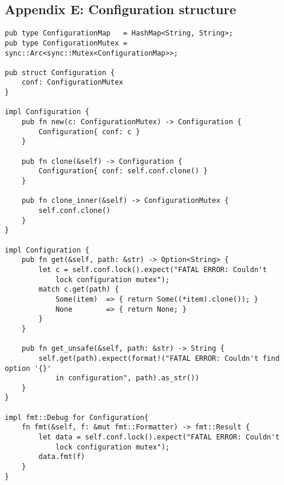     \subsection{Appendix E: Configuration structure}\label{apd:config}
        \begin{verbatim}
pub type ConfigurationMap   = HashMap<String, String>;
pub type ConfigurationMutex = sync::Arc<sync::Mutex<ConfigurationMap>>;

pub struct Configuration {
    conf: ConfigurationMutex
}

impl Configuration {
    pub fn new(c: ConfigurationMutex) -> Configuration {
        Configuration{ conf: c }
    }

    pub fn clone(&self) -> Configuration {
        Configuration{ conf: self.conf.clone() }
    }

    pub fn clone_inner(&self) -> ConfigurationMutex {
        self.conf.clone()
    }
}

impl Configuration {
    pub fn get(&self, path: &str) -> Option<String> {
        let c = self.conf.lock().expect("FATAL ERROR: Couldn't 
            lock configuration mutex");
        match c.get(path) {
            Some(item)  => { return Some((*item).clone()); }
            None        => { return None; }
        }
    }

    pub fn get_unsafe(&self, path: &str) -> String {
        self.get(path).expect(format!("FATAL ERROR: Couldn't find option '{}'
            in configuration", path).as_str())
    }
}

impl fmt::Debug for Configuration{
    fn fmt(&self, f: &mut fmt::Formatter) -> fmt::Result {
        let data = self.conf.lock().expect("FATAL ERROR: Couldn't 
            lock configuration mutex");
        data.fmt(f)
    }
}
        \end{verbatim}
        
    
    \pagebreak
    
